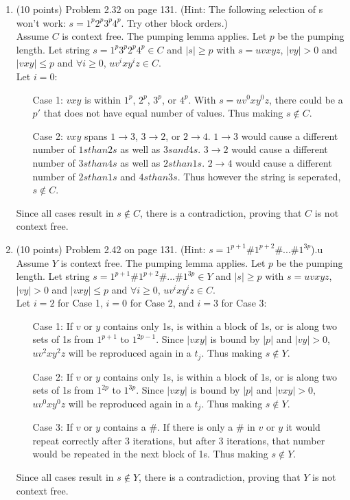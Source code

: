 \documentclass[11pt]{article}
\begin{document}
\begin{enumerate}
 \item (10 points) Problem 2.32 on page 131. (Hint: The following selection of s won't work: $s=1^p2^p3^p4^p$. Try other block orders.) \\
      Assume $C$ is context free. The pumping lemma applies. Let $p$ be the pumping length. Let string $s = 1^p3^p2^p4^p \in C$
	and $|s| \geq p$ with $s= uvxyz$, $|vy| > 0$ and $|vxy| \leq p$ and $\forall i \geq 0$, $uv^ixy^iz \in C$. \\
	Let $i = 0$:
	\begin{itemize}
	 \item[Case 1:] $vxy$ is within $1^p$, $2^p$, $3^p$, or $4^p$. With $s = uv^0xy^0z$, there could be a $p'$ that does not have 
	      equal number of values. Thus making $s \notin C$.
	 \item[Case 2:] $vxy$ spans $1 \to 3$, $3 \to 2$, or $2 \to 4$. $1 \to 3$ would cause a different number of $1s than 2s$ as well as
	      $3s and 4s$. $3 \to 2$ would cause a different number of $3s than 4s$ as well as $2s than 1s$. $2 \to 4$ would cause a different
	      number of $2s than 1s$ and $4s than 3s$. Thus however the string is seperated, $s \notin C$.
	\end{itemize}
	Since all cases result in $s \notin C$, there is a contradiction, proving that $C$ is not context free.
	
 \item (10 points) Problem 2.42 on page 131. (Hint: $s=1^{p+1}\#1^{p+2}\#...\#1^{3p}$).u \\
        Assume $Y$ is context free. The pumping lemma applies. Let $p$ be the pumping length. Let string $s = 1^{p+1}\#1^{p+2}\#...\#1^{3p}
        \in Y$ 	and $|s| \geq p$ with $s= uvxyz$, $|vy| > 0$ and $|vxy| \leq p$ and $\forall i \geq 0$, $uv^ixy^iz \in C$. \\
        Let $i = 2$ for Case 1, $i=0$ for Case 2, and $i = 3$ for Case 3:
	\begin{itemize}
	 \item[Case 1:] If $v$ or $y$ contains only 1s, is within a block of 1s, or is along two sets of 1s from $1^{p+1}$ to $1^{2p-1}$.
			Since $|vxy|$ is bound by $|p|$ and $|vy| > 0$, $uv^2xy^2z$ will be reproduced again in a $t_j$. Thus making $s \notin Y$.
	 \item[Case 2:] If $v$ or $y$ contains only 1s, is within a block of 1s, or is along two sets of 1s from $1^{2p}$ to $1^{3p}$.
			Since $|vxy|$ is bound by $|p|$ and $|vxy| > 0$, $uv^0xy^0z$ will be reproduced again in a $t_j$. Thus making $s \notin Y$.
	 \item[Case 3:] If $v$ or $y$ contains a $\#$. If there is only a $\#$ in $v$ or $y$ it would repeat correctly after 3 iterations,
			but after 3 iterations, that number would be repeated in the next block of 1s. Thus making $s \notin Y$.
	\end{itemize}
	Since all cases result in $s \notin Y$, there is a contradiction, proving that $Y$ is not context free.
 
\end{enumerate}
\end{document}
